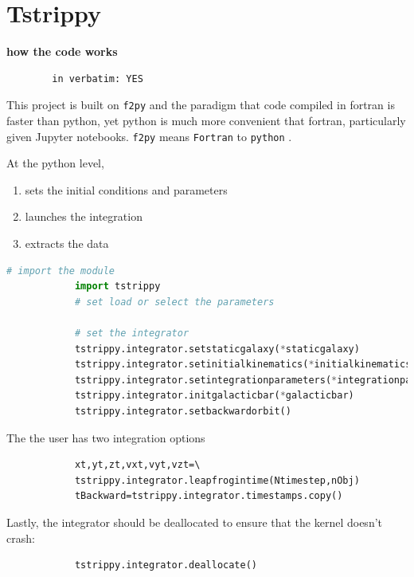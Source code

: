 \section{Tstrippy}

    
    \textbf{how the code works}

        \begin{verbatim}
        in verbatim: YES
        \end{verbatim}

        This project is built on \texttt{f2py} and the paradigm that code compiled in fortran is faster than python, yet python is much more convenient that fortran, particularly given Jupyter notebooks. \texttt{f2py} means \texttt{Fortran} to \texttt{python} \citep{peterson2009f2py}.   

        At the python level,
        \begin{enumerate}
            \item sets the initial conditions and parameters 
            \item launches the integration
            \item extracts the data
        \end{enumerate}

        \begin{lstlisting}[language=python]
            # import the module
            import tstrippy    
            # set load or select the parameters 

            # set the integrator
            tstrippy.integrator.setstaticgalaxy(*staticgalaxy)
            tstrippy.integrator.setinitialkinematics(*initialkinematics)
            tstrippy.integrator.setintegrationparameters(*integrationparameters)
            tstrippy.integrator.initgalacticbar(*galacticbar)
            tstrippy.integrator.setbackwardorbit()
        \end{lstlisting}

        The the user has two integration options 
        \begin{lstlisting}
            xt,yt,zt,vxt,vyt,vzt=\
            tstrippy.integrator.leapfrogintime(Ntimestep,nObj)
            tBackward=tstrippy.integrator.timestamps.copy()
        \end{lstlisting}

        Lastly, the integrator should be deallocated to ensure that the kernel doesn't crash:
        \begin{lstlisting}
            tstrippy.integrator.deallocate()
        \end{lstlisting}

